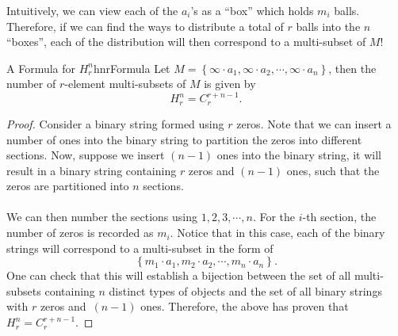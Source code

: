 \documentclass[math]{amznotes}
\theoremstyle{remark}
\newcommand{\0}{\mathbf{0}}
\newcommand{\1}{\mathbf{1}}
\begin{document}
Intuitively, we can view each of the $a_i$'s as a ``box'' which holds $m_i$ balls. Therefore, if we can find the ways to distribute a total of $r$ balls into the $n$ ``boxes'', each of the distribution will then correspond to a multi-subset of $M$!
\begin{probox}{A Formula for $H^n_r$}{hnrFormula}
    Let $M = \left\{\infty \cdot a_1, \infty \cdot a_2, \cdots, \infty \cdot a_n\right\}$, then the number of $r$-element multi-subsets of $M$ is given by
    \begin{equation*}
        H^n_r = C^{r + n - 1}_r.
    \end{equation*}
    \tcblower
    \begin{proof}
        Consider a binary string formed using $r$ zeros. Note that we can insert a number of ones into the binary string to partition the zeros into different sections. Now, suppose we insert $(n - 1)$ ones into the binary string, it will result in a binary string containing $r$ zeros and $(n - 1)$ ones, such that the zeros are partitioned into $n$ sections.
        \\\\
        We can then number the sections using $1, 2, 3, \cdots, n$. For the $i$-th section, the number of zeros is recorded as $m_i$. Notice that in this case, each of the binary strings will correspond to a multi-subset in the form of 
        \begin{displaymath}
            \left\{m_1 \cdot a_1, m_2 \cdot a_2, \cdots, m_n \cdot a_n\right\}.
        \end{displaymath}
        One can check that this will establish a bijection between the set of all multi-subsets containing $n$ distinct types of objects and the set of all binary strings with $r$ zeros and~$(n - 1)$ ones. Therefore, the above has proven that $H^n_r = C^{r + n - 1}_r$.
    \end{proof}
\end{probox}
\end{document}
